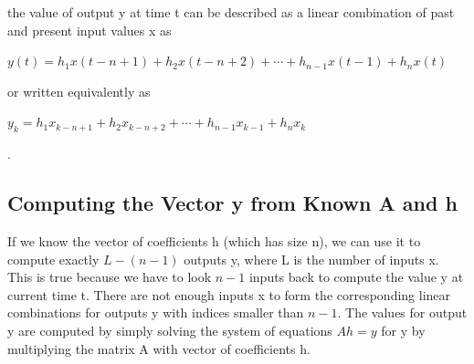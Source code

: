 \documentclass{article}
\begin{document}
\vspace{0.1mm}
\begin{flushleft}
the value of output y at time t can be described as a linear combination of past and present input values x as
\begin{large}
\begin{math} y(t) = h_{1}x(t-n+1) + h_{2}x(t-n+2) + \cdots + h_{n-1}x(t-1) + h_{n}x(t)
\end{math}
\end{large}
\break
or written equivalently as\newline
\begin{large}
\begin{math} y_{k} = h_{1}x_{k-n+1} + h_{2}x_{k-n+2} + \cdots + h_{n-1}x_{k-1} + h_{n}x_{k} \end{math}
\end{large}.
\end{flushleft}
\subsection{Computing the Vector y from Known A and h}
\begin{flushleft}
If we know the vector of coefficients h (which has size n), we can use it to compute exactly \begin{math}L-(n-1)\end{math} outputs y, where L is the number of inputs x. This is true because we have to look \begin{math}n-1\end{math} inputs back to compute the value y at current time t. There are not enough inputs x to form the corresponding linear combinations for outputs y with indices smaller than \begin{math}n-1 \end{math}. The values for output y are computed by simply solving the system of equations \begin{math}Ah = y\end{math} for y by multiplying the matrix A with vector of coefficients h.
\end{flushleft}
\end{document}
